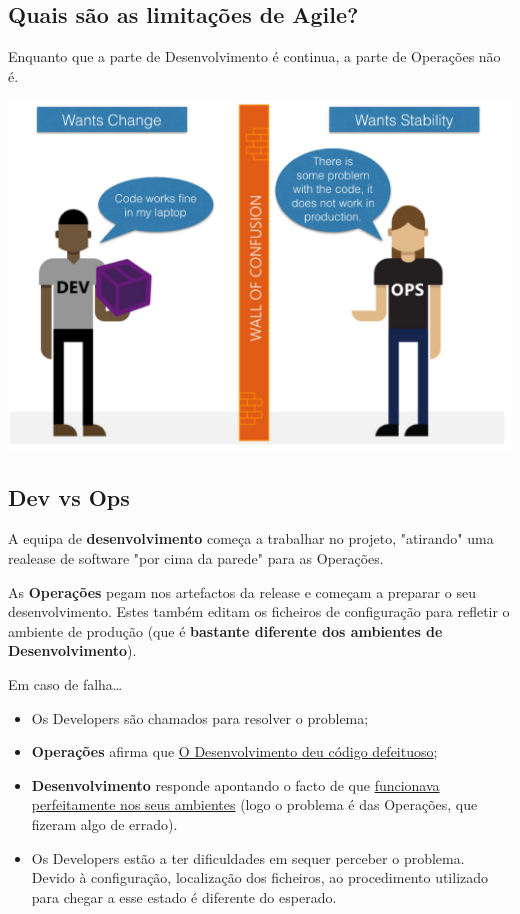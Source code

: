 \documentclass{article}
\begin{document}
\subsection{Quais são as limitações de Agile?}

Enquanto que a parte de Desenvolvimento é continua,
a parte de Operações não é.

\begin{center}
  \includegraphics[scale=0.6]{34}
\end{center}


\subsection{Dev vs Ops}

A equipa de \textbf{desenvolvimento} começa a trabalhar no projeto,
"atirando" uma realease de software "por cima da parede" para as
Operações.

\vspace{1mm}

As \textbf{Operações} pegam nos artefactos da release e começam
a preparar o seu desenvolvimento. Estes também  editam os ficheiros
de configuração para refletir o ambiente de produção
(que é \textbf{bastante diferente dos ambientes de Desenvolvimento}).

\pagebreak

Em caso de falha\dots
\begin{itemize}
  \item Os Developers são chamados para resolver o problema;
  \item \textbf{Operações} afirma que \uline{O Desenvolvimento
  deu código defeituoso};
  \item \textbf{Desenvolvimento} responde apontando o facto de que
  \uline{funcionava perfeitamente nos seus ambientes}
  (logo o problema é das Operações, que fizeram algo de errado).
  \item Os Developers estão a ter dificuldades em sequer perceber o problema.
  Devido à configuração, localização dos ficheiros, ao procedimento utilizado
  para chegar a esse estado é diferente do esperado.
\end{itemize}
\end{document}

